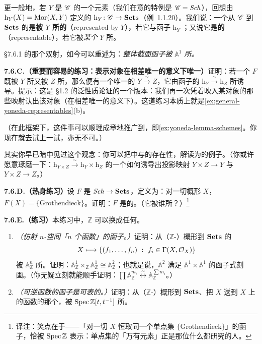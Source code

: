 更一般地，若 $Y$ 是\trCategory{} $\mathscr{C}$ 的一个元素（我们在意的特例是 $\mathscr{C}=\mathit{Sch}$），回想由 $\mathrm{h}_Y(X)=\operatorname{Mor}(X,Y)$ 定义的\trContravariantFunctor{} $\mathrm{h}_Y\colon\mathscr{C}\to\mathbf{Sets}$（例~1.1.20）。我们说：一个从 $\mathscr{C}$ 到 $\mathbf{Sets}$ 的\trContravariantFunctor{}是\textbf{被 $Y$ 所\trRepresentation{}的}（represented by $Y$），若它与函子 $\mathrm{h}_Y$ \trNaturalIsomorphism；又说它是\textbf{\trRepresentable{}的}（representable），若它被\emph{某个} $Y$ 所\trRepresentation。

\S7.6.1 的那个双射，如今可以重述为：\emph{整体截面函子被 $\mathbb{A}^1$ 所\trRepresentation。}

\textbf{7.6.C.（重要而容易的练习：表示对象在相差唯一\trIsomorphism{}的意义下唯一）}\quad 证明：若一个\trContravariantFunctor{} $F$ 既被 $Y$ 所\trRepresentation{}又被 $Z$ 所\trRepresentation，那么便有一个唯一的\trIsomorphism{} $Y\mathrel{\xrightarrow{\ \sim\ }}Z$，它由函子的\trNaturalIsomorphism{} $\mathrm{h}_Y\mathrel{\xrightarrow{\ \sim\ }}\mathrm{h}_Z$ 所诱导。提示：这是 \S1.2 的泛性质论证的一个版本：我们再一次凭着映入某对象的那些映射认出该对象（在相差唯一\trIsomorphism{}的意义下）。这道练习本质上就是\cref{ex:general-yoneda-representables}(b)。

（在此框架下，这件事可以顺理成章地推广到\trYonedaLemma，即\cref{ex:yoneda-lemma-schemes}。你现在就去试上一试，亦无不可。）

其实你早已暗中见过这个观念：你可以把\trCategory{}中\trProduct{}与\trFiberProduct{}的存在性，解读为\trRepresentableFunctor{}的例子。（你或许愿意琢磨一下：$\mathrm{h}_{Y\times Z}\mathrel{\xrightarrow{\ \sim\ }}\mathrm{h}_Y\times\mathrm{h}_Z$ 的一个\trNaturalIsomorphism{}如何诱导出投影映射 $Y\times Z\to Y$ 与 $Y\times Z\to Z$。）

\textbf{7.6.D.（热身练习）}\quad 设 $F$ 是\trContravariantFunctor{} $\mathit{Sch}\to\mathbf{Sets}$，定义为：对一切概形 $X$，$F(X)=\{\text{Grothendieck}\}$。证明：$F$ 是\trRepresentable{}的。（它被谁所\trRepresentation？）\footnote{译注：笑点在于——「对一切 $X$ 恒取同一个单点集 $\{\text{Grothendieck}\}$」的函子，恰被 $\operatorname{Spec}\mathbb{Z}$ 表示：单点集的「万有元素」正是那位什么都研究的人。}

\textbf{7.6.E.（练习）}\quad 本练习中，$\mathbb{Z}$ 可以换成任何\trRing。
\begin{enumerate}[label=(\alph*)]
  \item \emph{（仿射 $n$-空间\trRepresentation{}「$n$ 个函数」的函子。）}证明：从（$\mathbb{Z}$-）概形到 $\mathbf{Sets}$ 的\trContravariantFunctor
  \[
  X\longmapsto\{(f_1,\dots,f_n)\ :\ f_i\in\Gamma(X,\OO_X)\}
  \]
  被 $\mathbb{A}^n_{\mathbb{Z}}$ 所\trRepresentation。证明：$\mathbb{A}^1_{\mathbb{Z}}\times_{\mathbb{Z}}\mathbb{A}^1_{\mathbb{Z}}\cong\mathbb{A}^2_{\mathbb{Z}}$；也就是说，$\mathbb{A}^2$ 满足 $\mathbb{A}^1\times\mathbb{A}^1$ 的函子式刻画。（你无疑立刻就能顺手证明：$\prod\mathbb{A}^{m_i}_{\mathbb{Z}}\mathrel{\overset{\sim}{\longleftrightarrow}}\mathbb{A}^{\sum m_i}_{\mathbb{Z}}$。）
  \item \emph{（可逆函数的函子是可表的。）}证明：从（$\mathbb{Z}$-）概形到 $\mathbf{Sets}$、把 $X$ 送到 $X$ 上的\trInvertible{}函数的那个\trContravariantFunctor，被 $\operatorname{Spec}\mathbb{Z}[t,t^{-1}]$ 所\trRepresentation。
\end{enumerate}

